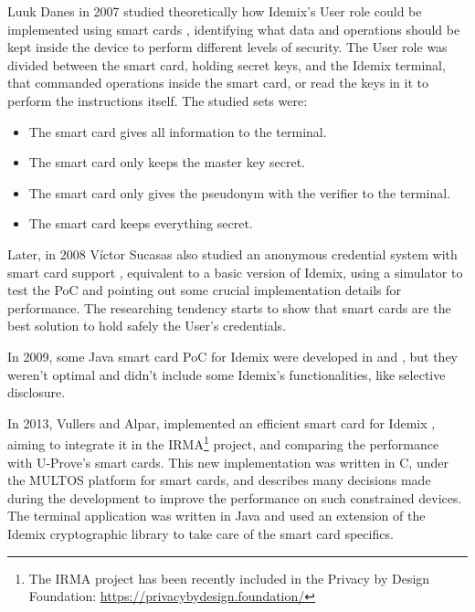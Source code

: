 Luuk Danes in 2007 studied theoretically how Idemix's User role could be implemented using  
smart cards \cite{luuk}, identifying what data and operations should be kept inside the device to perform different levels of security. The User role was divided between the smart card, holding secret keys, and the Idemix terminal, that commanded operations inside the smart card, or read the keys in it to perform the instructions itself. The studied sets were:
\begin{itemize}
	\item The smart card gives all information to the terminal.
	\item The smart card only keeps the master key secret.
	\item The smart card only gives the pseudonym with the verifier to the terminal.
	\item The smart card keeps everything secret.
\end{itemize}

Later, in 2008 Víctor Sucasas also studied an anonymous credential system with smart card support \cite{sucasas}, equivalent to a basic version of Idemix, using a simulator to test the PoC and pointing out some crucial implementation details for performance. The researching tendency starts to show that smart cards are the best solution to hold safely the User's credentials.

In 2009, some Java smart card PoC for Idemix were developed in \cite{javaIdemix1} and \cite{javaIdemix2}, but they weren't optimal and didn't include some Idemix's functionalities, like selective disclosure.

In 2013, Vullers and Alpar, implemented an efficient smart card for Idemix \cite{vullers2013efficient}, aiming to integrate it in the IRMA\footnote{The IRMA project has been recently included in the Privacy by Design Foundation: \url{https://privacybydesign.foundation/}} project, and comparing the performance with U-Prove's smart cards. This new implementation was written in C, under the MULTOS platform for smart cards, and describes many decisions made during the development to improve the performance on such constrained devices. The terminal application was written in Java and used an extension of the Idemix cryptographic library to take care of the smart card specifics.



